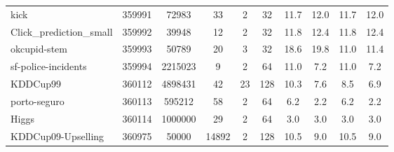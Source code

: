 \documentclass[11pt]{article}
\begin{document}
\begin{table}[H]
{\begin{tabular}{@{}lccccc|cc|cc@{}}
kick                                        & 359991         & 72983       & 33         & 2         & 32          & 11.7                     & 12.0          & 11.7                        & 12.0              \\
Click\_prediction\_small                    & 359992         & 39948       & 12         & 2         & 32          & 11.8                     & 12.4          & 11.8                        & 12.4              \\
okcupid-stem                                & 359993         & 50789       & 20         & 3         & 32          & 18.6                     & 19.8          & 11.0                        & 11.4              \\
sf-police-incidents                         & 359994         & 2215023     & 9          & 2         & 64          & 11.0                     & 7.2           & 11.0                        & 7.2               \\
KDDCup99                                    & 360112         & 4898431     & 42         & 23        & 128         & 10.3                     & 7.6           & 8.5                         & 6.9               \\
porto-seguro                                & 360113         & 595212      & 58         & 2         & 64          & 6.2                      & 2.2           & 6.2                         & 2.2               \\
Higgs                                       & 360114         & 1000000     & 29         & 2         & 64          & 3.0                      & 3.0           & 3.0                         & 3.0               \\
KDDCup09-Upselling                          & 360975         & 50000       & 14892      & 2         & 128         & 10.5                     & 9.0           & 10.5                        & 9.0               \\ \bottomrule
\end{tabular}%
}
\end{table}
\end{document}
